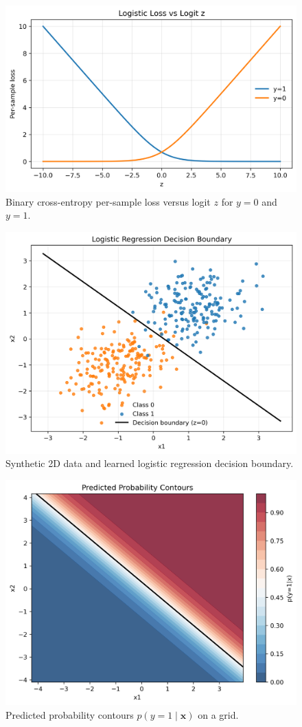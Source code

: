 \documentclass[11pt,a4paper]{article}
\begin{document}
\begin{figure}[H]
  \centering
  \includegraphics[width=0.7\linewidth]{logistic_loss_curves.png}
  \caption{Binary cross-entropy per-sample loss versus logit $z$ for $y=0$ and $y=1$.}
  \label{fig:loss}
\end{figure}

\begin{figure}[H]
  \centering
  \includegraphics[width=0.75\linewidth]{decision_boundary.png}
  \caption{Synthetic 2D data and learned logistic regression decision boundary.}
  \label{fig:boundary}
\end{figure}

\begin{figure}[H]
  \centering
  \includegraphics[width=0.75\linewidth]{probability_contours.png}
  \caption{Predicted probability contours $p(y=1\mid \bm{x})$ on a grid.}
  \label{fig:contours}
\end{figure}
\end{document}
